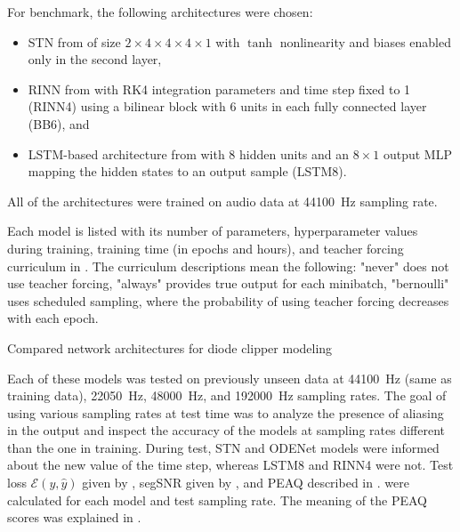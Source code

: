 For benchmark, the following architectures were chosen:
\begin{itemize}
    \item \ac{STN} from \cite{Parker2019} of size $2 \times 4 \times 4 \times 4 \times 1$ with $\tanh$ nonlinearity and biases enabled only in the second layer, 
    \item \ac{RINN} from \cite{Ouala2019} with \ac{RK}4 integration parameters and time step fixed to 1 (\ac{RINN}4) using a bilinear block with 6 units in each fully connected layer (BB6), and 
    \item \ac{LSTM}-based architecture from \cite{Wright2019} with 8 hidden units and an $8 \times 1$ output \ac{MLP} mapping the hidden states to an output sample (\ac{LSTM}8).
\end{itemize}

All of the architectures were trained on audio data at \SI{44100}{Hz} sampling rate.

Each model is listed with its number of parameters,
hyperparameter values during training, training time (in epochs and hours), and teacher forcing curriculum in . The curriculum descriptions mean the following: "never" does not use teacher forcing, "always" provides true output for each minibatch, "bernoulli" uses scheduled sampling, where the probability of using teacher forcing decreases with each epoch. 
\begin{table}[]
    \caption{Compared network architectures for diode clipper modeling}
    
    \label{tab:diode_clipper_models_data}
\end{table}

Each of these models was tested on previously unseen data at \SI{44100}{Hz} (same as training data), \SI{22050}{Hz}, \SI{48000}{Hz}, and \SI{192000}{Hz} sampling rates. The goal of using various sampling rates at test time was to analyze the presence of aliasing in the output and inspect the accuracy of the models at sampling rates different than the one in training. During test, \ac{STN} and ODENet models were informed about the new value of the time step, whereas \ac{LSTM}8 and \ac{RINN}4 were not. Test loss $\mathcal{E}(y, \hat{y})$ given by , \ac{segSNR} given by , and \ac{PEAQ} described in .
were calculated for each model and test sampling rate. The meaning of the \ac{PEAQ} scores was explained in .

